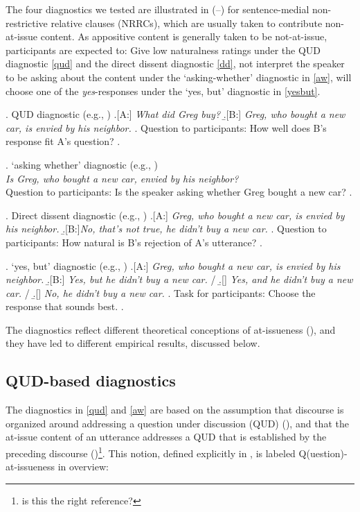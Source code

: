 \documentclass[times,linguex]{glossa}
\begin{document}
  The four diagnostics we tested are illustrated in (--) for sentence-medial non-restrictive relative clauses (NRRCs), which are usually taken to contribute non-at-issue content.  As appositive content is generally taken to be not-at-issue, participants are expected to: Give low naturalness ratings under the QUD diagnostic \ref{qud} and the direct dissent diagnostic \ref{dd}, not interpret the speaker to be asking about the content under the `asking-whether' diagnostic in \ref{aw}, will choose one of the \emph{yes}-responses under the `yes, but' diagnostic in \ref{yesbut}.

  \ex. \label{qud}%
    QUD diagnostic (e.g., \citealt{tonhauser_diagnosing_2012,chen_presuppositions_2024})
    \a.[A:] \emph{What did Greg buy?}
    \b.[B:] \emph{Greg, who bought a new car, is envied by his neighbor.}
    \z.
    Question to participants: How well does B's response fit A's question?
  \z.

  \ex. \label{aw}%
    `asking whether' diagnostic (e.g., \citealt{tonhauser_how_2018,solstad_cataphoric_2024})\smallskip\\
      \emph{Is Greg, who bought a new car, envied by his neighbor?}\smallskip
  \\ Question to participants: Is the speaker asking whether Greg bought a new car?
  \z.

  \ex. \label{dd} Direct dissent diagnostic (e.g., \citealt{tonhauser_diagnosing_2012,syrett_experimental_2015})
    \a.[A:] \emph{Greg, who bought a new car, is envied by his neighbor.}
    \b.[B:]\emph{No, that's not true, he didn't buy a new car.}
    \z.
  Question to participants: How natural is B's rejection of A's utterance?
  \z.

  \ex. \label{yesbut}%
    `yes, but' diagnostic (e.g., \citealt{xue_correlation_2011,destruel_cross-linguistic_2015})
    \a.[A:] \emph{Greg, who bought a new car, is envied by his neighbor.}
    \b.[B:] \emph{Yes, but he didn't buy a new car.} /
    \b.[] \emph{Yes, and he didn't buy a new car.} /
    \b.[] \emph{No, he didn't buy a new car.}
    \z.
    Task for participants: Choose the response that sounds best.
  \z.

  The diagnostics reflect different theoretical conceptions of at-issueness (\citealt{koev_notions_2018}), and they have led to different empirical results, discussed below.


  \subsection{QUD-based diagnostics}
    The diagnostics in \ref{qud} and \ref{aw} are based on the assumption that discourse is organized around addressing a question under discussion (QUD) (\citealt{roberts_information_1996,ginzburg_interrogatives_1996}), and that the at-issue content of an utterance addresses a QUD that is established by the preceding discourse (\citealt{amaral_review_2007})\footnote{is this the right reference?}. This notion, defined explicitly in \citealt{simons_what_2010}, is labeled Q(uestion)-at-issueness in  overview:
\end{document}
